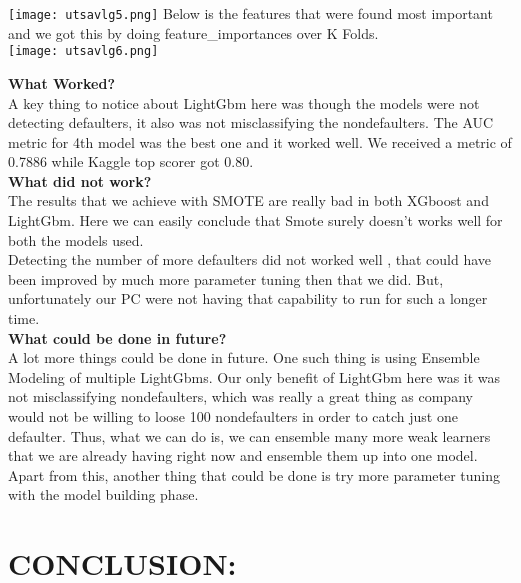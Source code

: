 \documentclass[fleqn,10pt]{SelfArx} %
\begin{document}
\begin{itemize}
\texttt{[image: utsavlg5.png]}
\label{fig:results}
\bigbreak
\noindent
Below is the features that were found most important and we got this by doing feature_importances over K Folds.\\
\texttt{[image: utsavlg6.png]}
\label{fig:results}

\bigbreak
\noindent
\textbf{What Worked?}\\
A key thing to notice about LightGbm here was though the models were not detecting defaulters, it also was not misclassifying the nondefaulters. The AUC metric for 4th model was the best one and it worked well. We received a metric of 0.7886 while Kaggle top scorer got 0.80.\\
\bigbreak
\noindent
\textbf{What did not work?}\\
The results that we achieve with SMOTE are really bad in both XGboost and LightGbm. Here we can easily conclude that Smote surely doesn’t works  well for both the models used.\\ Detecting the number of more defaulters did not worked well , that could have been improved by much more parameter tuning then that we did. But, unfortunately our PC were not having that capability to run for such a longer time. \\
\bigbreak
\noindent
\textbf{What could be done in future?}\\
A lot more things could be done in future. One such thing is using Ensemble Modeling of multiple LightGbms. Our only benefit of LightGbm here was it was not misclassifying nondefaulters, which was really a great thing as company would not be willing to loose 100 nondefaulters in order to catch just one defaulter. Thus, what we can do is, we can ensemble many more weak learners that we are already having right now and ensemble them up into one model. Apart from this, another thing that could be done is try more parameter tuning with the model building phase. 


\pagebreak
\section{CONCLUSION:}


\end{itemize}
\end{document}
